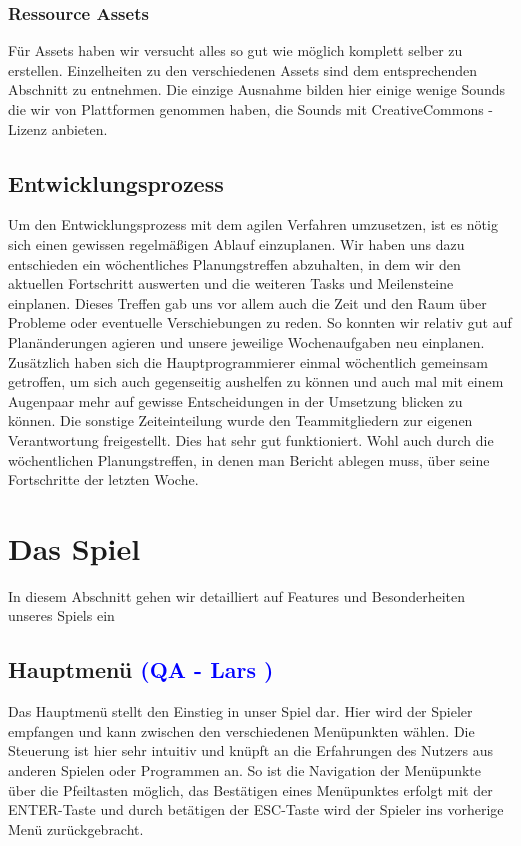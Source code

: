 \documentclass[12pt]{article}
\begin{document}
\subsubsection{Ressource Assets}
Für Assets haben wir versucht alles so gut wie möglich komplett selber zu erstellen. Einzelheiten zu den verschiedenen Assets sind dem entsprechenden Abschnitt zu entnehmen.
Die einzige Ausnahme bilden hier einige wenige Sounds die wir von Plattformen genommen haben, die Sounds mit CreativeCommons - Lizenz anbieten. 

\vspace{2cm}
\subsection{Entwicklungsprozess}
Um den Entwicklungsprozess mit dem agilen Verfahren umzusetzen, ist es nötig sich einen gewissen regelmäßigen Ablauf einzuplanen. \newline
Wir haben uns dazu entschieden ein wöchentliches Planungstreffen abzuhalten,
in dem wir den aktuellen Fortschritt auswerten und die weiteren Tasks und Meilensteine einplanen. Dieses Treffen gab uns vor allem auch die Zeit und den Raum über Probleme oder eventuelle Verschiebungen zu reden. So konnten wir relativ gut auf Planänderungen agieren und unsere jeweilige Wochenaufgaben neu einplanen. \newline
Zusätzlich haben sich die Hauptprogrammierer einmal wöchentlich gemeinsam getroffen, um sich auch gegenseitig aushelfen zu können und auch mal mit einem Augenpaar mehr auf gewisse Entscheidungen in der Umsetzung blicken zu können.
Die sonstige Zeiteinteilung wurde den Teammitgliedern zur eigenen Verantwortung freigestellt. Dies hat sehr gut funktioniert. Wohl auch durch die wöchentlichen Planungstreffen, in denen man Bericht ablegen muss, über seine Fortschritte der letzten Woche.

\newpage
\section{Das Spiel}
In diesem Abschnitt gehen wir detailliert auf Features und Besonderheiten unseres Spiels ein

\vspace{2cm}
\subsection{Hauptmenü \textcolor{blue}{(QA - Lars )}}

Das Hauptmenü stellt den Einstieg in unser Spiel dar. Hier wird der Spieler empfangen und kann zwischen den verschiedenen Menüpunkten wählen.
Die Steuerung ist hier sehr intuitiv und knüpft an die Erfahrungen des Nutzers aus anderen Spielen oder Programmen an. So ist die Navigation der Menüpunkte über die Pfeiltasten möglich, das Bestätigen eines Menüpunktes erfolgt mit der ENTER-Taste und durch betätigen der ESC-Taste wird der Spieler ins vorherige Menü zurückgebracht.
\end{document}
